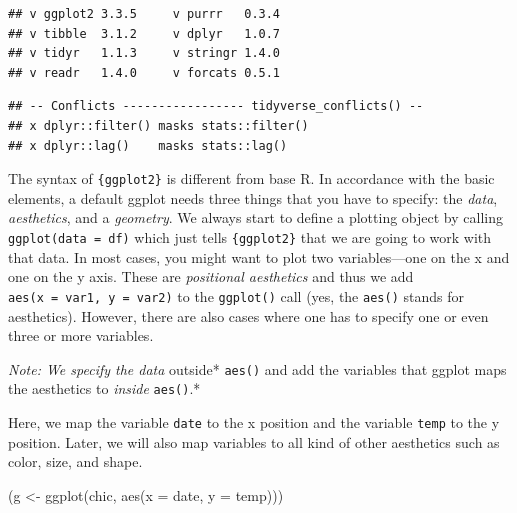 \documentclass[
]{krantz}
\makeatletter
\newenvironment{Shaded}{\begin{snugshade}}{\end{snugshade}}
\newcommand{\AttributeTok}[1]{\textcolor[rgb]{0.61,0.61,0.61}{#1}}
\newcommand{\FunctionTok}[1]{\textcolor[rgb]{0,0,0}{#1}}
\newcommand{\NormalTok}[1]{#1}
\newcommand{\OtherTok}[1]{\textcolor[rgb]{0.37,0.37,0.37}{#1}}
\newenvironment{kframe}{%
\medskip{}
\setlength{\fboxsep}{.8em}
 \def\at@end@of@kframe{}%
 \ifinner\ifhmode%
  \def\at@end@of@kframe{\end{minipage}}%
  \begin{minipage}{\columnwidth}%
 \fi\fi%
 \def\FrameCommand##1{\hskip\@totalleftmargin \hskip-\fboxsep
 \colorbox{shadecolor}{##1}\hskip-\fboxsep
     \hskip-\linewidth \hskip-\@totalleftmargin \hskip\columnwidth}%
 \MakeFramed {\advance\hsize-\width
   \@totalleftmargin\z@ \linewidth\hsize
   \@setminipage}}%
 {\par\unskip\endMakeFramed%
 \at@end@of@kframe}
\renewenvironment{Shaded}{\begin{kframe}}{\end{kframe}}
\makeatother
\begin{document}
\begin{verbatim}
## v ggplot2 3.3.5     v purrr   0.3.4
## v tibble  3.1.2     v dplyr   1.0.7
## v tidyr   1.1.3     v stringr 1.4.0
## v readr   1.4.0     v forcats 0.5.1
\end{verbatim}

\begin{verbatim}
## -- Conflicts ----------------- tidyverse_conflicts() --
## x dplyr::filter() masks stats::filter()
## x dplyr::lag()    masks stats::lag()
\end{verbatim}

The syntax of \texttt{\{ggplot2\}} is different from base R. In accordance with the basic elements, a default ggplot needs three things that you have to specify: the \emph{data}, \emph{aesthetics}, and a \emph{geometry}. We always start to define a plotting object by calling \texttt{ggplot(data\ =\ df)} which just tells \texttt{\{ggplot2\}} that we are going to work with that data. In most cases, you might want to plot two variables---one on the x and one on the y axis. These are \emph{positional aesthetics} and thus we add \texttt{aes(x\ =\ var1,\ y\ =\ var2)} to the \texttt{ggplot()} call (yes, the \texttt{aes()} stands for aesthetics). However, there are also cases where one has to specify one or even three or more variables.

\emph{Note: We specify the data }outside* \texttt{aes()} and add the variables that ggplot maps the aesthetics to \emph{inside} \texttt{aes()}.*

Here, we map the variable \texttt{date} to the x position and the variable \texttt{temp} to the y position. Later, we will also map variables to all kind of other aesthetics such as color, size, and shape.

\begin{Shaded}
\begin{Highlighting}[]
\NormalTok{(g }\OtherTok{\textless{}{-}} \FunctionTok{ggplot}\NormalTok{(chic, }\FunctionTok{aes}\NormalTok{(}\AttributeTok{x =}\NormalTok{ date, }\AttributeTok{y =}\NormalTok{ temp)))}
\end{Highlighting}
\end{Shaded}
\end{document}
